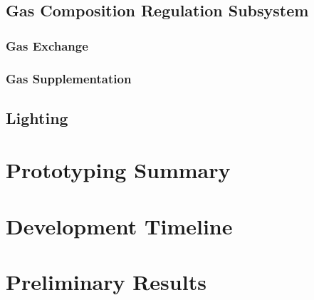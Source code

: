 \documentclass{../tex/report}
\begin{document}
\subsection{Gas Composition Regulation Subsystem}
\subsubsection{Gas Exchange}
\subsubsection{Gas Supplementation}
\subsection{Lighting}

\section{Prototyping Summary}

\section{Development Timeline}

\section{Preliminary Results}

\newpage



\end{document}
